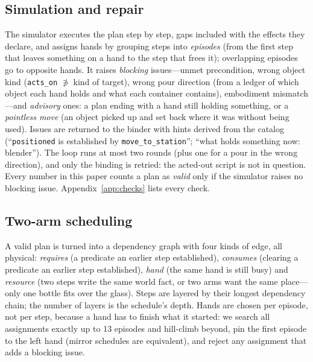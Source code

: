 \documentclass[10pt,twocolumn,letterpaper]{article}
\newcommand{\code}[1]{\texttt{\small #1}}
\begin{document}
\subsection{Simulation and repair}\label{sec:sim}
The simulator executes the plan step by step, gaps included with the effects they
declare, and assigns hands by grouping steps into \emph{episodes} (from the first
step that leaves something on a hand to the step that frees it); overlapping
episodes go to opposite hands. It raises \emph{blocking} issues---unmet
precondition, wrong object kind (\code{acts\_on} $\not\ni$ kind of target), wrong
pour direction (from a ledger of which object each hand holds and what each
container contains), embodiment mismatch---and \emph{advisory} ones: a plan ending
with a hand still holding something, or a \emph{pointless move} (an object picked
up and set back where it was without being used). Issues are returned to the binder
with hints derived from the catalog (``\code{positioned} is established by
\code{move\_to\_station}''; ``what holds something now: blender''). The loop runs
at most two rounds (plus one for a pour in the wrong direction), and only the
binding is retried: the acted-out script is not in question. Every number in this
paper counts a plan as \emph{valid} only if the simulator raises no blocking issue.
Appendix~\ref{app:checks} lists every check.

\subsection{Two-arm scheduling}\label{sec:sched}
A valid plan is turned into a dependency graph with four kinds of edge, all
physical: \emph{requires} (a predicate an earlier step established),
\emph{consumes} (clearing a predicate an earlier step established), \emph{hand}
(the same hand is still busy) and \emph{resource} (two steps write the same world
fact, or two arms want the same place---only one bottle fits over the glass). Steps
are layered by their longest dependency chain; the number of layers is the
schedule's depth. Hands are chosen per episode, not per step, because a hand has
to finish what it started: we search all assignments exactly up to 13 episodes
and hill-climb beyond, pin the first episode to the left hand (mirror schedules
are equivalent), and reject any assignment that adds a blocking issue.
\end{document}
